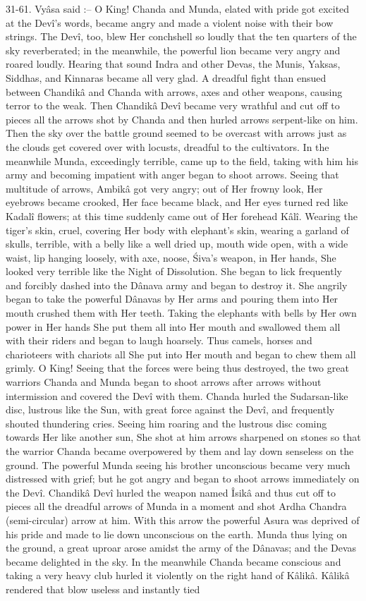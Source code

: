 31-61. Vy\^asa said :-- O King! Chanda and Munda, elated with pride got excited at the Dev\^i's words, became angry and made a violent noise with their bow strings. The Dev\^i, too, blew Her conchshell so loudly that the ten quarters of the sky reverberated; in the meanwhile, the powerful lion became very angry and roared loudly. Hearing that sound Indra and other Devas, the Munis, Yaksas, Siddhas, and Kinnaras became all very glad. A dreadful fight than ensued between Chandik\^a and Chanda with arrows, axes and other weapons, causing terror to the weak. Then Chandik\^a Dev\^i became very wrathful and cut off to pieces all the arrows shot by Chanda and then hurled arrows serpent-like on him. Then the sky over the battle ground seemed to be overcast with arrows just as the clouds get covered over with locusts, dreadful to the cultivators. In the meanwhile Munda, exceedingly terrible, came up to the field, taking with him his army and becoming impatient with anger began to shoot arrows. Seeing that multitude of arrows, Ambik\^a got very angry; out of Her frowny look, Her eyebrows became crooked, Her face became black, and Her eyes turned red like Kadal\^i flowers; at this time suddenly came out of Her forehead K\^al\^i. Wearing the tiger's skin, cruel, covering Her body with elephant's skin, wearing a garland of skulls, terrible, with a belly like a well dried up, mouth wide open, with a wide waist, lip hanging loosely, with axe, noose, \'Siva's weapon, in Her hands, She looked very terrible like the Night of Dissolution. She began to lick frequently and forcibly dashed into the D\^anava army and began to destroy it. She angrily began to take the powerful D\^anavas by Her arms and pouring them into Her mouth crushed them with Her teeth. Taking the elephants with bells by Her own power in Her hands She put them all into Her mouth and swallowed them all with their riders and began to laugh hoarsely. Thus camels, horses and charioteers with chariots all She put into Her mouth and began to chew them all grimly. O King! Seeing that the forces were being thus destroyed, the two great warriors Chanda and Munda began to shoot arrows after arrows without intermission and covered the Dev\^i with them. Chanda hurled the Sudarsan-like disc, lustrous like the Sun, with great force against the Dev\^i, and frequently shouted thundering cries. Seeing him roaring and the lustrous disc coming towards Her like another sun, She shot at him arrows sharpened on stones so that the warrior Chanda became overpowered by them and lay down senseless on the ground. The powerful Munda seeing his brother unconscious became very much distressed with grief; but he got angry and began to shoot arrows immediately on the Dev\^i. Chandik\^a Dev\^i hurled the weapon named Îsik\^a and thus cut off to pieces all the dreadful arrows of Munda in a moment and shot Ardha Chandra (semi-circular) arrow at him. With this arrow the powerful Asura was deprived of his pride and made to lie down unconscious on the earth. Munda thus lying on the ground, a great uproar arose amidst the army of the D\^anavas; and the Devas became delighted in the sky. In the meanwhile Chanda became conscious and taking a very heavy club hurled it violently on the right hand of K\^alik\^a. K\^alik\^a rendered that blow useless and instantly tied 